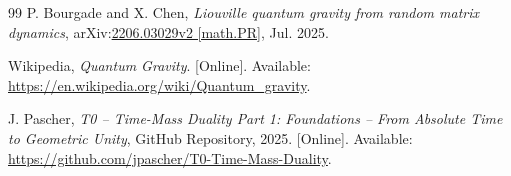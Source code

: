 \begin{thebibliography}{99}
	P. Bourgade and X. Chen,
	\emph{Liouville quantum gravity from random matrix dynamics},
	arXiv:\href{https://arxiv.org/abs/2206.03029}{2206.03029v2 [math.PR]}, Jul. 2025.
	
	Wikipedia, \emph{Quantum Gravity}.
	[Online]. Available: \href{https://en.wikipedia.org/wiki/Quantum_gravity}{https://en.wikipedia.org/wiki/Quantum\_gravity}.
	
	J. Pascher,
	\emph{T0 – Time-Mass Duality Part 1: Foundations – From Absolute Time to Geometric Unity},
	GitHub Repository, 2025.
	[Online]. Available: \href{https://github.com/jpascher/T0-Time-Mass-Duality}{https://github.com/jpascher/T0-Time-Mass-Duality}.
	
\end{thebibliography}